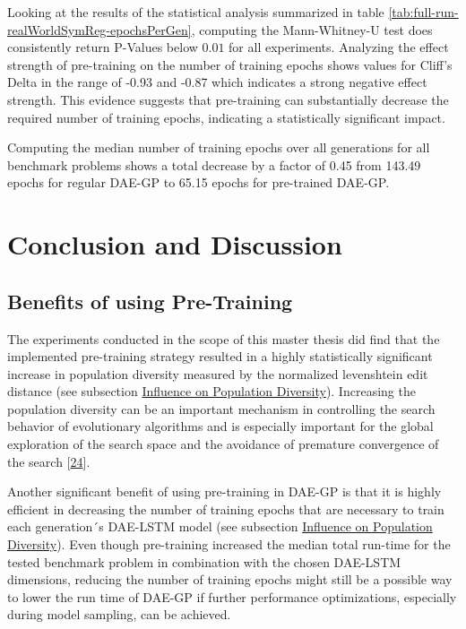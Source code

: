\documentclass[
  11pt,
]{article}
\begin{document}
Looking at the results of the statistical analysis summarized in table \ref{tab:full-run-realWorldSymReg-epochsPerGen}, computing the Mann-Whitney-U test does consistently return P-Values below \(0.01\) for all experiments.
Analyzing the effect strength of pre-training on the number of training epochs shows values for Cliff's Delta in the range of -0.93 and -0.87 which indicates a strong negative effect strength.
This evidence suggests that pre-training can substantially decrease the required number of training epochs, indicating a statistically significant impact.

Computing the median number of training epochs over all generations for all benchmark problems shows a total decrease by a factor of 0.45 from 143.49 epochs for regular DAE-GP to 65.15 epochs for pre-trained DAE-GP.

\hypertarget{conclusion-and-discussion}{%
\section{Conclusion and Discussion}\label{conclusion-and-discussion}}

\hypertarget{benefits-of-using-pre-training}{%
\subsection{Benefits of using Pre-Training}\label{benefits-of-using-pre-training}}

The experiments conducted in the scope of this master thesis did find that the implemented pre-training strategy resulted in a highly statistically significant increase in population diversity measured by the normalized levenshtein edit distance (see subsection \protect\hyperlink{influence-on-population-diversity-1}{Influence on Population Diversity}).
Increasing the population diversity can be an important mechanism in controlling the search behavior of evolutionary algorithms and is especially important for the global exploration of the search space and the avoidance of premature convergence of the search {[}\protect\hyperlink{ref-Sudholt2020}{24}{]}.

Another significant benefit of using pre-training in DAE-GP is that it is highly efficient in decreasing the number of training epochs that are necessary to train each generation´s DAE-LSTM model (see subsection \protect\hyperlink{influence-on-population-diversity-1}{Influence on Population Diversity}).
Even though pre-training increased the median total run-time for the tested benchmark problem in combination with the chosen DAE-LSTM dimensions, reducing the number of training epochs might still be a possible way to lower the run time of DAE-GP if further performance optimizations, especially during model sampling, can be achieved.
\end{document}
